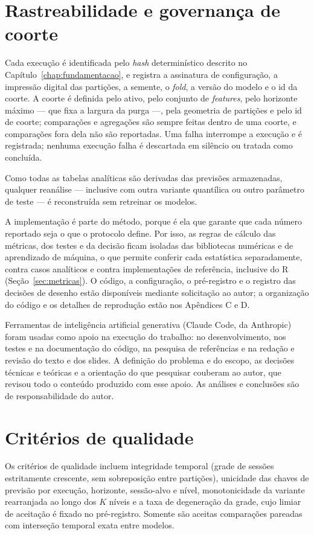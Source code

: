 \section{Rastreabilidade e governança de coorte} \label{sec:governanca}
Cada execução é identificada pelo \textit{hash} determinístico descrito no Capítulo~\ref{chap:fundamentacao}, e registra a assinatura de configuração, a impressão digital das partições, a semente, o \textit{fold}, a versão do modelo e o id da coorte. A coorte é definida pelo ativo, pelo conjunto de \textit{features}, pelo horizonte máximo --- que fixa a largura da purga ---, pela geometria de partições e pelo id de coorte; comparações e agregações são sempre feitas dentro de uma coorte, e comparações fora dela não são reportadas. Uma falha interrompe a execução e é registrada; nenhuma execução falha é descartada em silêncio ou tratada como concluída.

Como todas as tabelas analíticas são derivadas das previsões armazenadas, qualquer reanálise --- inclusive com outra variante quantílica ou outro parâmetro de teste --- é reconstruída sem retreinar os modelos.

A implementação é parte do método, porque é ela que garante que cada número reportado seja o que o protocolo define. Por isso, as regras de cálculo das métricas, dos testes e da decisão ficam isoladas das bibliotecas numéricas e de aprendizado de máquina, o que permite conferir cada estatística separadamente, contra casos analíticos e contra implementações de referência, inclusive do R (Seção~\ref{sec:metricas}). O código, a configuração, o pré-registro e o registro das decisões de desenho estão disponíveis mediante solicitação ao autor; a organização do código e os detalhes de reprodução estão nos Apêndices C e D.

Ferramentas de inteligência artificial generativa (Claude Code, da Anthropic) foram usadas como apoio na execução do trabalho: no desenvolvimento, nos testes e na documentação do código, na pesquisa de referências e na redação e revisão do texto e dos slides. A definição do problema e do escopo, as decisões técnicas e teóricas e a orientação do que pesquisar couberam ao autor, que revisou todo o conteúdo produzido com esse apoio. As análises e conclusões são de responsabilidade do autor.

\section{Critérios de qualidade}
Os critérios de qualidade incluem integridade temporal (grade de sessões estritamente crescente, sem sobreposição entre partições), unicidade das chaves de previsão por execução, horizonte, sessão-alvo e nível, monotonicidade da variante rearranjada ao longo dos \(K\) níveis e a taxa de degeneração da grade, cujo limiar de aceitação é fixado no pré-registro. Somente são aceitas comparações pareadas com interseção temporal exata entre modelos.

